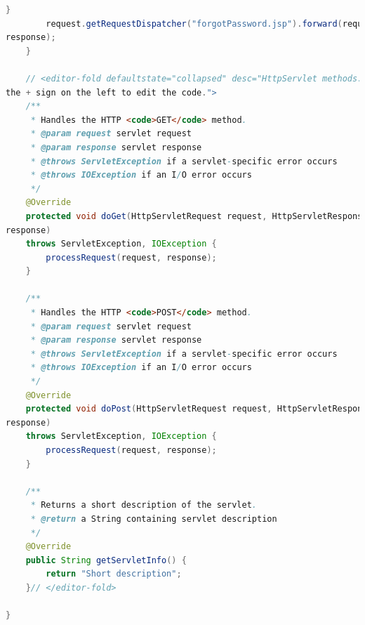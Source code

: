 \documentclass[a4paper,12pt]{article}
\begin{document}
\begin{lstlisting}[language=Java, style=customJava, 
caption={RecuperarContraServlet.java},captionpos=b,basicstyle=\fontfamily{cmss}
\small]
        }
        request.getRequestDispatcher("forgotPassword.jsp").forward(request, 
response);
    } 

    // <editor-fold defaultstate="collapsed" desc="HttpServlet methods. Click on 
the + sign on the left to edit the code.">
    /** 
     * Handles the HTTP <code>GET</code> method.
     * @param request servlet request
     * @param response servlet response
     * @throws ServletException if a servlet-specific error occurs
     * @throws IOException if an I/O error occurs
     */
    @Override
    protected void doGet(HttpServletRequest request, HttpServletResponse 
response)
    throws ServletException, IOException {
        processRequest(request, response);
    } 

    /** 
     * Handles the HTTP <code>POST</code> method.
     * @param request servlet request
     * @param response servlet response
     * @throws ServletException if a servlet-specific error occurs
     * @throws IOException if an I/O error occurs
     */
    @Override
    protected void doPost(HttpServletRequest request, HttpServletResponse 
response)
    throws ServletException, IOException {
        processRequest(request, response);
    }

    /** 
     * Returns a short description of the servlet.
     * @return a String containing servlet description
     */
    @Override
    public String getServletInfo() {
        return "Short description";
    }// </editor-fold>

}
\end{lstlisting}
\end{document}
